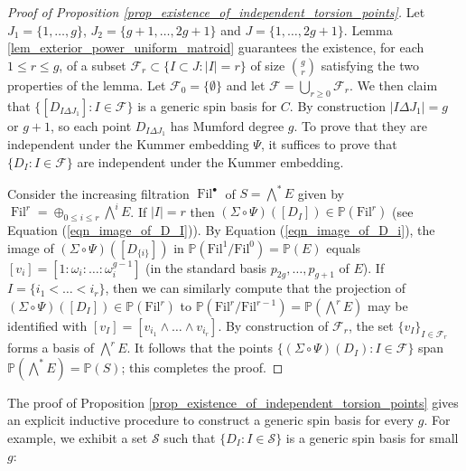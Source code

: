 \documentclass{article} %
\numberwithin{equation}{section}
\renewcommand{\P}{\mathbb{P}}
\begin{document}
\begin{proof}[Proof of Proposition \ref{prop_existence_of_independent_torsion_points}]
    Let $J_1 = \{1, \dots, g\}$, $J_2 = \{g+1, \dots, 2g+1\}$ and $J = \{1, \dots, 2g+1\}$.
    Lemma \ref{lem_exterior_power_uniform_matroid} guarantees the existence, for each $1\leq r\leq g$, of a subset $\mathcal{F}_r\subset \{I\subset J\colon |I| = r\}$ of size $\binom{g}{r}$ satisfying the two properties of the lemma. 
    Let $\mathcal{F}_0 = \{\emptyset\}$ and let $\mathcal{F} = \bigcup_{r\geq 0} \mathcal{F}_r$.
    We then claim that $\{[D_{I\Delta J_1}] \colon I\in \mathcal{F}\}$ is a generic spin basis for $C$.
    By construction $|I\Delta J_1| = g$ or $g+1$, so each point $D_{I\Delta J_1}$ has Mumford degree $g$.
    To prove that they are independent under the Kummer embedding $\Psi$, it suffices to prove that $\{D_I \colon I\in \mathcal{F}\}$ are independent under the Kummer embedding. 

    Consider the increasing filtration $\operatorname{Fil}^\bullet$ of $S = \bigwedge^\ast E$ given by $\operatorname{Fil}^r = \oplus_{0 \leq i \leq r} \bigwedge^i E$.
    If $|I|=r$ then $(\Sigma \circ \Psi)([D_I]) \in \P(\mathrm{Fil}^r)$ (see Equation (\ref{eqn_image_of_D_I})).
    By Equation (\ref{eqn_image_of_D_i}), the image of $(\Sigma \circ\Psi)([D_{\{i\}}])$ in $\P(\mathrm{Fil}^1/\mathrm{Fil}^0) = \P(E)$ equals $[v_i] = [1 : \omega_i : \dots : \omega_i^{g-1}]$ (in the standard basis $p_{2g}, \dots, p_{g+1}$ of $E$). 
    If $I = \{i_1 < \dots < i_r \}$, then we can similarly compute that the projection of $(\Sigma \circ \Psi)([D_I]) \in \P(\mathrm{Fil}^r)$ to $\P(\mathrm{Fil}^r/\mathrm{Fil}^{r-1}) =\P( \bigwedge^r E)$ may be identified with $[v_I] = [v_{i_1} \wedge \dots \wedge v_{i_r}]$.  By construction of $\mathcal{F}_r$, the set $\{v_I\}_{I\in \mathcal{F}_r}$ forms a basis of $\bigwedge^r E$.
    It follows that the points $\{(\Sigma \circ\Psi)(D_I) \colon I\in \mathcal{F}\}$ span $\P(\bigwedge^* E) = \P(S)$; this completes the proof. 
\end{proof}
    The proof of Proposition \ref{prop_existence_of_independent_torsion_points} gives an explicit inductive procedure to construct a generic spin basis for every $g$.
    For example, we exhibit a set $\mathcal{S}$ such that $\{D_I \colon I \in \mathcal{S}\}$ is a generic spin basis for small $g$:
\end{document}
